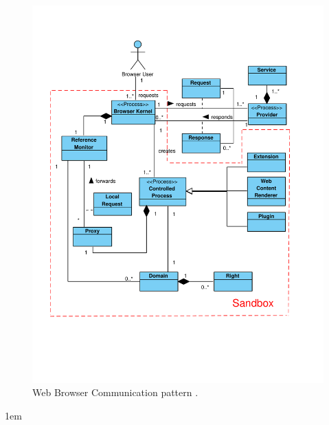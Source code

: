 \documentclass[prodmode,acmtecs]{acmsmall}
\begin{document}
    \begin{figure}[h!t]
      \vspace*{-1.4cm}
      \centering
      \includegraphics[scale=0.48]{figures/BrowserInfrastructure-v3.pdf}
      \vspace*{-2.5cm}
      \caption{Web Browser Communication pattern \cite{silva2015}.}
      \label{fig:WBCP}
    \end{figure}


    \leftskip1em
\end{document}
